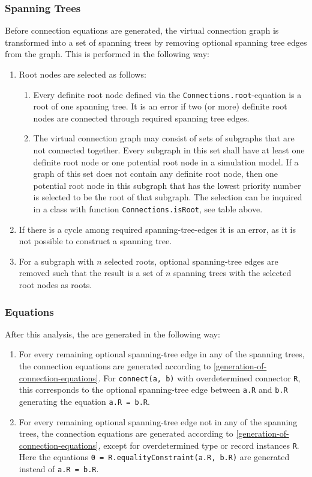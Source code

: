 \subsubsection{Spanning Trees}
Before connection equations are generated, the virtual connection graph is transformed into a set of spanning trees by removing optional spanning tree edges from the graph.
This is performed in the following way:
\begin{enumerate}
\item
  Root nodes are selected as follows:
\begin{enumerate}
\item
  Every definite root node defined via the \lstinline!Connections.root!-equation is a root of one spanning tree.
  It is an error if two (or more) definite root nodes are connected through required spanning tree edges.
\item
  The virtual connection graph may consist of sets of subgraphs that are not connected together.
  Every subgraph in this set shall have at least one definite root node or one potential root node in a simulation model.
  If a graph of this set does not contain any definite root node, then one potential root node in this subgraph that has the lowest priority number is selected to be the root of that subgraph.
  The selection can be inquired in a class with function \lstinline!Connections.isRoot!, see table above.
\end{enumerate}
\item
  If there is a cycle among required spanning-tree-edges it is an error, as it is not possible to construct a spanning tree.
\item
  For a subgraph with $n$ selected roots, optional spanning-tree edges are removed such that the result is a set of $n$ spanning trees with the selected root nodes as roots.
\end{enumerate}

\subsubsection{Equations}
After this analysis, the  are generated in the following way:
\begin{enumerate}
\item
  For every remaining optional spanning-tree edge in any of the spanning trees, the connection equations are generated according to \cref{generation-of-connection-equations}.
  For \lstinline!connect(a, b)! with overdetermined connector \lstinline!R!, this corresponds to the optional spanning-tree edge between \lstinline!a.R! and \lstinline!b.R! generating the equation \lstinline!a.R = b.R!.
\item
  For every remaining optional spanning-tree edge not in any of the spanning trees, the connection equations are generated according to \cref{generation-of-connection-equations}, except for overdetermined type or record instances \lstinline!R!.
  Here the equations \lstinline!0 = R.equalityConstraint(a.R, b.R)! are generated instead of \lstinline!a.R = b.R!.
\end{enumerate}

